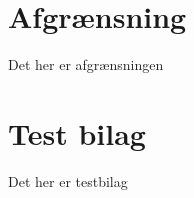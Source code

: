 \section{Afgrænsning} \label{bilag:afgrænsning}
Det her er afgrænsningen
\section{Test bilag} \label{bilag:test}

Det her er testbilag